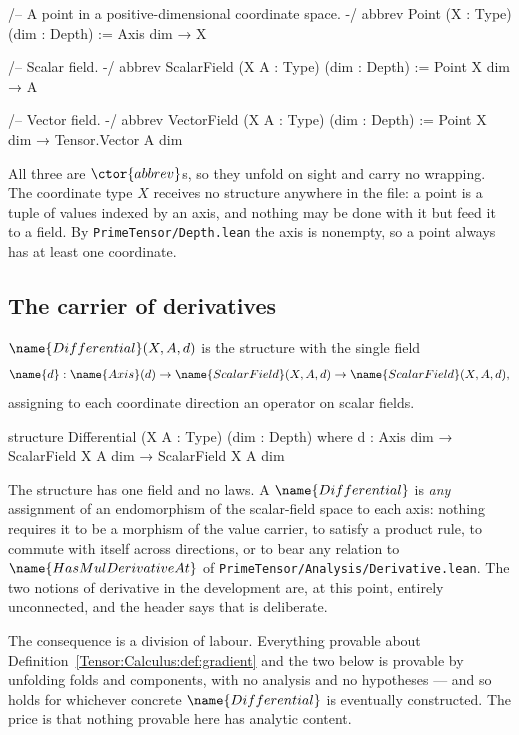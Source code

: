 \begin{leancode}
/-- A point in a positive-dimensional coordinate space. -/
abbrev Point (X : Type) (dim : Depth) := Axis dim → X

/-- Scalar field. -/
abbrev ScalarField (X A : Type) (dim : Depth) := Point X dim → A

/-- Vector field. -/
abbrev VectorField (X A : Type) (dim : Depth) := Point X dim → Tensor.Vector A dim
\end{leancode}

All three are $\ctor{abbrev}$s, so they unfold on sight and carry no wrapping.
The coordinate type $X$ receives no structure anywhere in the file: a point is
a tuple of values indexed by an axis, and nothing may be done with it but feed
it to a field.  By \texttt{PrimeTensor/Depth.lean} the axis is nonempty, so a
point always has at least one coordinate.

\subsection{The carrier of derivatives}

\begin{definition}\label{Tensor:Calculus:def:differential}
$\name{Differential}(X,A,d)$ is the structure with the single field
\[
  \name{d} : \name{Axis}(d) \to
    \name{ScalarField}(X,A,d) \to \name{ScalarField}(X,A,d),
\]
assigning to each coordinate direction an operator on scalar fields.
\end{definition}

\begin{leancode}
structure Differential (X A : Type) (dim : Depth) where
  d : Axis dim → ScalarField X A dim → ScalarField X A dim
\end{leancode}

\begin{remark}\label{Tensor:Calculus:rem:no-axioms}
The structure has one field and no laws.  A $\name{Differential}$ is
\emph{any} assignment of an endomorphism of the scalar-field space to each
axis: nothing requires it to be a morphism of the value carrier, to satisfy a
product rule, to commute with itself across directions, or to bear any relation
to $\name{HasMulDerivativeAt}$ of
\texttt{PrimeTensor/Analysis/Derivative.lean}.  The two notions of derivative
in the development are, at this point, entirely unconnected, and the header
says that is deliberate.

The consequence is a division of labour.  Everything provable about
Definition~\ref{Tensor:Calculus:def:gradient} and the two below is provable by
unfolding folds and components, with no analysis and no hypotheses --- and so
holds for whichever concrete $\name{Differential}$ is eventually constructed.
The price is that nothing provable here has analytic content.
\end{remark}

